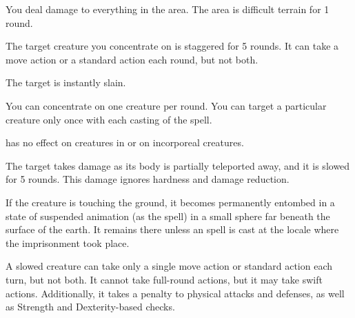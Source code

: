 \begin{comment}
\subsubsection{I}
\end{comment}

\spelleffect You deal damage to everything in the area. The area is difficult terrain for 1 round.

\begin{spellhealthy}
    The target creature you concentrate on is staggered for 5 rounds. It can take a move action or a standard action each round, but not both.
\end{spellhealthy}
\begin{spellblood}
    The target is instantly slain.
\end{spellblood}
\spellnotes You can concentrate on one creature per round. You can target a particular creature only once with each casting of the spell.
\par {} has no effect on creatures in  or on incorporeal creatures.

\spelleffect The target takes damage as its body is partially teleported away, and it is slowed for 5 rounds. This damage ignores hardness and damage reduction.
\begin{spellblood}
    If the creature is touching the ground, it becomes permanently entombed in a state of suspended animation (as the  spell) in a small sphere far beneath the surface of the earth. It remains there unless an  spell is cast at the locale where the imprisonment took place.
\end{spellblood}
\spellnotes A slowed creature can take only a single move action or standard action each turn, but not both. It cannot take full-round actions, but it may take swift actions. Additionally, it takes a  penalty to physical attacks and defenses, as well as Strength and Dexterity-based checks.

